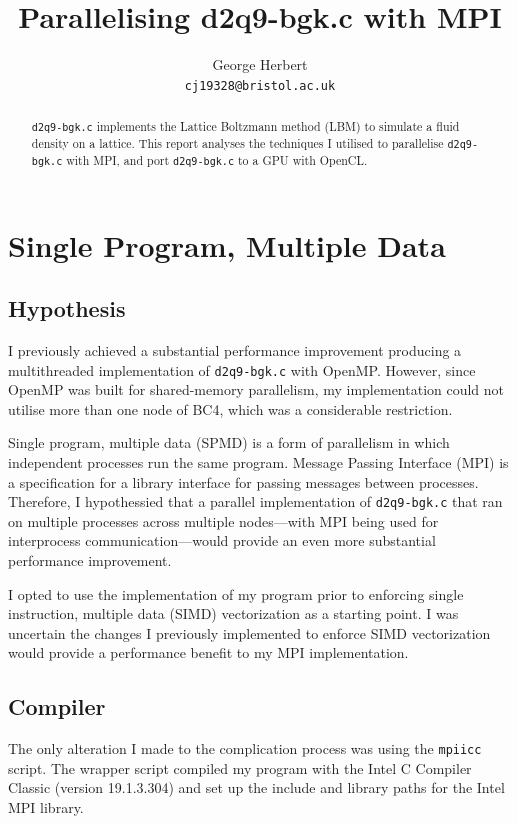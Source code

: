 \documentclass[twocolumn, a4paper]{article}
\author{
  George Herbert\\
  \texttt{cj19328@bristol.ac.uk}
}
\title{\vspace{-2em}Parallelising d2q9-bgk.c with MPI}
\begin{document}
\maketitle

\begin{abstract}
  \texttt{d2q9-bgk.c} implements the Lattice Boltzmann method (LBM) to simulate a fluid density on a lattice.
  This report analyses the techniques I utilised to parallelise \texttt{d2q9-bgk.c} with MPI, and port \texttt{d2q9-bgk.c} to a GPU with OpenCL.
\end{abstract}

\section{Single Program, Multiple Data}

\subsection{Hypothesis}

I previously achieved a substantial performance improvement producing a multithreaded implementation of \texttt{d2q9-bgk.c} with OpenMP.
However, since OpenMP was built for shared-memory parallelism, my implementation could not utilise more than one node of BC4, which was a considerable restriction.

Single program, multiple data (SPMD) is a form of parallelism in which independent processes run the same program.
Message Passing Interface (MPI) is a specification for a library interface for passing messages between processes.
Therefore, I hypothessied that a parallel implementation of \texttt{d2q9-bgk.c} that ran on multiple processes across multiple nodes---with MPI being used for interprocess communication---would provide an even more substantial performance improvement.

I opted to use the implementation of my program prior to enforcing single instruction, multiple data (SIMD) vectorization as a starting point.
I was uncertain the changes I previously implemented to enforce SIMD vectorization would provide a performance benefit to my MPI implementation.

\subsection{Compiler}

The only alteration I made to the complication process was using the \texttt{mpiicc} script.
The wrapper script compiled my program with the Intel C Compiler Classic (version 19.1.3.304) and set up the include and library paths for the Intel MPI library.
\end{document}
